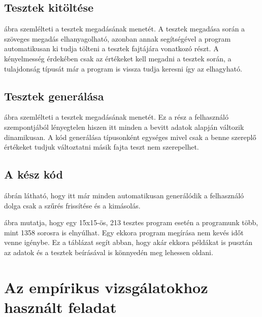 \documentclass[12pt,a4paper,oneside]{report}
\begin{document}

\section*{Tesztek kitöltése}

 ábra szemlélteti a tesztek megadásának menetét.
A tesztek megadása során a szöveges megadás elhanyagolható, azonban annak segítségével a program automatikusan ki tudja tölteni a tesztek fajtájára vonatkozó részt.
A kényelmesség érdekében csak az értékeket kell megadni a tesztek során, a tulajdonság típusát már a program is vissza tudja keresni így az elhagyható.


\section*{Tesztek generálása}

 ábra szemlélteti a tesztek megadásának menetét.
Ez a rész a felhasználó szempontjából lényegtelen hiszen itt minden a bevitt adatok alapján változik dinamikusan.
A kód generálása típusonként egységes mivel csak a benne szereplő értékeket tudjuk változtatni másik fajta teszt nem szerepelhet.


\section*{A kész kód}

 ábrán látható, hogy itt már minden automatikusan generálódik a felhasználó dolga csak a szűrés frissítése és a kimásolás.

 ábra mutatja, hogy egy 15x15-ös, 213 tesztes program esetén a programunk több, mint 1358 sorosra is elnyúlhat.
Egy ekkora program megírása nem kevés időt venne igénybe.
Ez a táblázat segít abban, hogy akár ekkora példákat is pusztán az adatok és a tesztek beírásával is könnyedén meg lehessen oldani.


\chapter{Az empírikus vizsgálatokhoz használt feladat}
\label{fundraiser}
\end{document}
